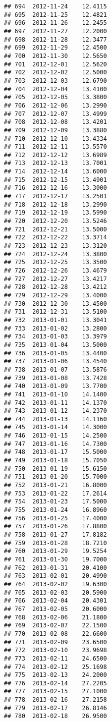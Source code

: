 \documentclass[
]{article}
\begin{document}
\begin{verbatim}
## 694  2012-11-24    12.4115
## 695  2012-11-25    12.4821
## 696  2012-11-26    12.2455
## 697  2012-11-27    12.2000
## 698  2012-11-28    12.3477
## 699  2012-11-29    12.4500
## 700  2012-11-30    12.5650
## 701  2012-12-01    12.5620
## 702  2012-12-02    12.5000
## 703  2012-12-03    12.6790
## 704  2012-12-04    13.4100
## 705  2012-12-05    13.3800
## 706  2012-12-06    13.2990
## 707  2012-12-07    13.4999
## 708  2012-12-08    13.4201
## 709  2012-12-09    13.3880
## 710  2012-12-10    13.4334
## 711  2012-12-11    13.5570
## 712  2012-12-12    13.6989
## 713  2012-12-13    13.7001
## 714  2012-12-14    13.6000
## 715  2012-12-15    13.4901
## 716  2012-12-16    13.3000
## 717  2012-12-17    13.2501
## 718  2012-12-18    13.2990
## 719  2012-12-19    13.5990
## 720  2012-12-20    13.5246
## 721  2012-12-21    13.5000
## 722  2012-12-22    13.3714
## 723  2012-12-23    13.3120
## 724  2012-12-24    13.3800
## 725  2012-12-25    13.3500
## 726  2012-12-26    13.4679
## 727  2012-12-27    13.4217
## 728  2012-12-28    13.4212
## 729  2012-12-29    13.4000
## 730  2012-12-30    13.4500
## 731  2012-12-31    13.5100
## 732  2013-01-01    13.3041
## 733  2013-01-02    13.2800
## 734  2013-01-03    13.3979
## 735  2013-01-04    13.5000
## 736  2013-01-05    13.4400
## 737  2013-01-06    13.4540
## 738  2013-01-07    13.5876
## 739  2013-01-08    13.7428
## 740  2013-01-09    13.7700
## 741  2013-01-10    14.1400
## 742  2013-01-11    14.1370
## 743  2013-01-12    14.2370
## 744  2013-01-13    14.1160
## 745  2013-01-14    14.3000
## 746  2013-01-15    14.2500
## 747  2013-01-16    14.7300
## 748  2013-01-17    15.5000
## 749  2013-01-18    15.7050
## 750  2013-01-19    15.6150
## 751  2013-01-20    15.7000
## 752  2013-01-21    16.8000
## 753  2013-01-22    17.2614
## 754  2013-01-23    17.5000
## 755  2013-01-24    16.8960
## 756  2013-01-25    17.4000
## 757  2013-01-26    17.8800
## 758  2013-01-27    17.8182
## 759  2013-01-28    18.7210
## 760  2013-01-29    19.5254
## 761  2013-01-30    19.7000
## 762  2013-01-31    20.4100
## 763  2013-02-01    20.4990
## 764  2013-02-02    19.6300
## 765  2013-02-03    20.5900
## 766  2013-02-04    20.4301
## 767  2013-02-05    20.6000
## 768  2013-02-06    21.1800
## 769  2013-02-07    22.1500
## 770  2013-02-08    22.6600
## 771  2013-02-09    23.6500
## 772  2013-02-10    23.9698
## 773  2013-02-11    24.6500
## 774  2013-02-12    25.1698
## 775  2013-02-13    24.2000
## 776  2013-02-14    27.2205
## 777  2013-02-15    27.1000
## 778  2013-02-16    27.2158
## 779  2013-02-17    26.8146
## 780  2013-02-18    26.9500

\end{verbatim}
\end{document}

